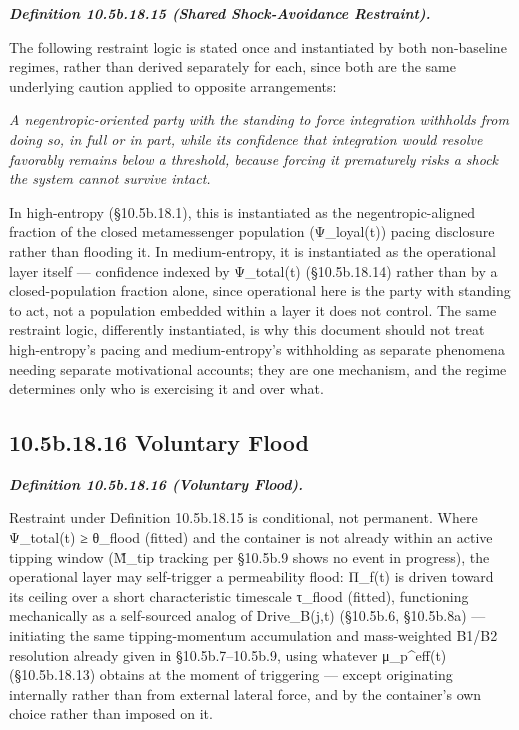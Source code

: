 \documentclass[
]{article}
\begin{document}
\emph{\textbf{Definition 10.5b.18.15 (Shared Shock-Avoidance
Restraint).}}

The following restraint logic is stated once and instantiated by both
non-baseline regimes, rather than derived separately for each, since
both are the same underlying caution applied to opposite arrangements:

\emph{A negentropic-oriented party with the standing to force
integration withholds from doing so, in full or in part, while its
confidence that integration would resolve favorably remains below a
threshold, because forcing it prematurely risks a shock the system
cannot survive intact.}

In high-entropy (§10.5b.18.1), this is instantiated as the
negentropic-aligned fraction of the closed metamessenger population
(Ψ\_loyal(t)) pacing disclosure rather than flooding it. In
medium-entropy, it is instantiated as the operational layer itself ---
confidence indexed by Ψ\_total(t) (§10.5b.18.14) rather than by a
closed-population fraction alone, since operational here is the party
with standing to act, not a population embedded within a layer it does
not control. The same restraint logic, differently instantiated, is why
this document should not treat high-entropy's pacing and
medium-entropy's withholding as separate phenomena needing separate
motivational accounts; they are one mechanism, and the regime determines
only who is exercising it and over what.

\hypertarget{b.18.16-voluntary-flood}{%
\subsection{10.5b.18.16 Voluntary Flood}\label{b.18.16-voluntary-flood}}

\emph{\textbf{Definition 10.5b.18.16 (Voluntary Flood).}}

Restraint under Definition 10.5b.18.15 is conditional, not permanent.
Where Ψ\_total(t) ≥ θ\_flood (fitted) and the container is not already
within an active tipping window (M̃\_tip tracking per §10.5b.9 shows no
event in progress), the operational layer may self-trigger a
permeability flood: Π\_f(t) is driven toward its ceiling over a short
characteristic timescale τ\_flood (fitted), functioning mechanically as
a self-sourced analog of Drive\_B(j,t) (§10.5b.6, §10.5b.8a) ---
initiating the same tipping-momentum accumulation and mass-weighted
B1/B2 resolution already given in §10.5b.7--10.5b.9, using whatever
μ\_p\^{}eff(t) (§10.5b.18.13) obtains at the moment of triggering ---
except originating internally rather than from external lateral force,
and by the container's own choice rather than imposed on it.
\end{document}
